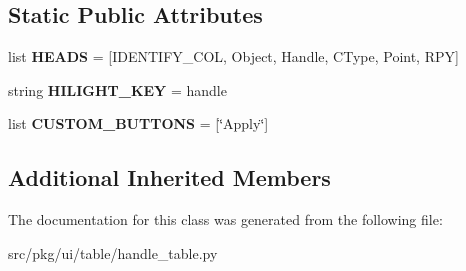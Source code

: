 \subsection*{Static Public Attributes}
\begin{DoxyCompactItemize}
\item 
\mbox{\label{classrnb-planning_1_1src_1_1pkg_1_1ui_1_1table_1_1handle__table_1_1_handle_table_ae7465641653d9ae164cb98af800595df}} 
list {\bfseries H\+E\+A\+DS} = \mbox{[}I\+D\+E\+N\+T\+I\+F\+Y\+\_\+\+C\+OL, \textquotesingle{}Object\textquotesingle{}, \textquotesingle{}Handle\textquotesingle{}, \textquotesingle{}C\+Type\textquotesingle{}, \textquotesingle{}Point\textquotesingle{}, \textquotesingle{}R\+PY\textquotesingle{}\mbox{]}
\item 
\mbox{\label{classrnb-planning_1_1src_1_1pkg_1_1ui_1_1table_1_1handle__table_1_1_handle_table_abffd13d185c383be85cd42505f7adb58}} 
string {\bfseries H\+I\+L\+I\+G\+H\+T\+\_\+\+K\+EY} = \textquotesingle{}handle\textquotesingle{}
\item 
\mbox{\label{classrnb-planning_1_1src_1_1pkg_1_1ui_1_1table_1_1handle__table_1_1_handle_table_aab031eff180c2613f6d1b3fe9cfb2162}} 
list {\bfseries C\+U\+S\+T\+O\+M\+\_\+\+B\+U\+T\+T\+O\+NS} = \mbox{[}\char`\"{}Apply\char`\"{}\mbox{]}
\end{DoxyCompactItemize}
\subsection*{Additional Inherited Members}


The documentation for this class was generated from the following file\+:\begin{DoxyCompactItemize}
\item 
src/pkg/ui/table/handle\+\_\+table.\+py\end{DoxyCompactItemize}
